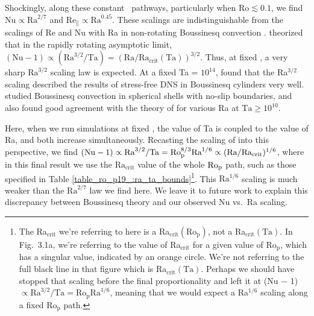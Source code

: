 Shockingly, along these constant \pro$\,$ pathways, particularly when $\text{Ro} \lesssim 0.1$, 
we find $\text{Nu} \propto \text{Ra}^{2/7}$ and $\text{Re}_\parallel \propto \text{Ra}^{0.45}$.
These scalings are indistinguishable from the scalings of
Re and Nu with Ra in non-rotating Boussinesq convection \citep{ahlers&all2009}.  
\cite{julien&all2012} theorized that in the rapidly rotating
asymptotic limit, $(\text{Nu} - 1) \propto (\text{Ra}^{3/2}/\text{Ta}) = (\text{Ra}/\text{Ra}_{\text{crit}}(\text{Ta}))^{3/2}$. Thus,
at fixed , a very sharp $\text{Ra}^{3/2}$ scaling law is expected. 
At a fixed Ta = $10^{14}$, \cite{stellmach&all2014} found that the Ra$^{3/2}$ scaling described
the results of stress-free DNS in Boussinesq cylinders very well.  \cite{gastine&all2016} 
studied Boussinesq convection in spherical shells with no-slip boundaries, and also found 
good agreement with the theory of \cite{julien&all2012} for various Ra at $\text{Ta} \geq 10^{10}$.

Here, when we run simulations at fixed \pro, the value of Ta is coupled to the value of Ra, and both increase simultaneously.
Recasting the scaling of 
\cite{julien&all2012} into this perspective, we find 
$(\text{Nu} - 1) \propto \text{Ra}^{3/2}/\text{Ta} = \text{Ro}_{\text{p}}^{8/3}\text{Ra}^{1/6} \propto (\text{Ra}/\text{Ra}_{\text{crit}})^{1/6}$, 
where in this final result we use the $\text{Ra}_{\text{crit}}$ value of the whole $\text{Ro}_{\text{p}}$ path, such as those
specified in Table \ref{table_ro_p19_:ra_ta_bounds}\footnote{
The Ra$_{\text{crit}}$ we're referring to here is a Ra$_{\text{crit}}(\text{Ro}_{\text{p}})$, not a Ra$_{\text{crit}}(\text{Ta})$.
In Fig.~3.1a, we're referring to the value of Ra$_{\text{crit}}$ for a given value of $\text{Ro}_\text{p}$, which has a singular value, indicated by an orange circle.
We're not referring to the full black line in that figure which is Ra$_{\text{crit}}(\text{Ta})$.
Perhaps we should have stopped that scaling before the final proportionality and left it at (Nu − 1) $\propto \text{Ra}^{3/2} / \text{Ta} = \text{Ro}_{\text{p}} \text{Ra}^{1/6}$, meaning that we would expect a Ra$^{1/6}$ scaling along a fixed Ro$_{\text{p}}$ path.
}.
This $\text{Ra}^{1/6}$ scaling is much weaker than the $\text{Ra}^{2/7}$ law we find here. 
We leave it to future work to explain this discrepancy between
Boussinesq theory and our observed Nu vs.~Ra scaling.

